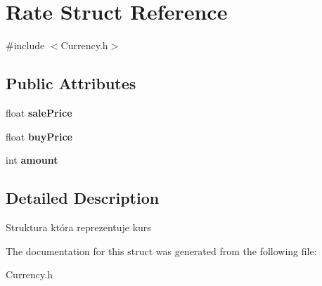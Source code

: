 \hypertarget{structRate}{}\section{Rate Struct Reference}
\label{structRate}


{\ttfamily \#include $<$Currency.\+h$>$}

\subsection*{Public Attributes}
\begin{DoxyCompactItemize}
\item 
float {\bfseries sale\+Price}\hypertarget{structRate_adf2a4a18a2e33ec4090674aa06a73d9a}{}\label{structRate_adf2a4a18a2e33ec4090674aa06a73d9a}

\item 
float {\bfseries buy\+Price}\hypertarget{structRate_ad5f59559db17e3e6f3ef0be4431fcf77}{}\label{structRate_ad5f59559db17e3e6f3ef0be4431fcf77}

\item 
int {\bfseries amount}\hypertarget{structRate_a6cffdff50c61450e5cbf5d739a98e17a}{}\label{structRate_a6cffdff50c61450e5cbf5d739a98e17a}

\end{DoxyCompactItemize}


\subsection{Detailed Description}
Struktura która reprezentuje kurs 

The documentation for this struct was generated from the following file\+:\begin{DoxyCompactItemize}
\item 
Currency.\+h\end{DoxyCompactItemize}
